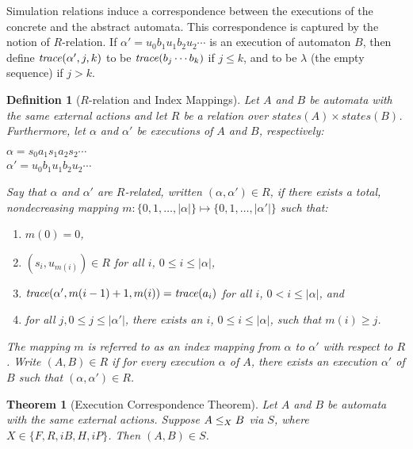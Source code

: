 \documentclass[11pt]{article}
\newcommand{\bn}{\begin{enumerate}}
\newcommand{\en}{\end{enumerate}}
\newcommand{\bt}{\begin{theorem}}
\newcommand{\et}{\end{theorem}}
\newcommand{\bd}{\begin{definition}}
\newcommand{\ed}{\end{definition}}
\newcommand{\intrdef}{\emph}	\newcommand{\intr}{\emph}
\newcommand{\al}{\alpha}
\newcommand{\states}{\mathit{states}}
\newtheorem{theorem}{Theorem}
\newtheorem{definition}{Definition}
\newcommand{\ms}[1]{\relax\ifmmode
                \mathord{\mathcode`\-="702D\it #1\mathcode`\-="2200}\else
{\it #1}\fi
}
\begin{document}
Simulation relations induce a correspondence between the executions of
the concrete and the abstract automata. This correspondence is
captured by the notion of $R$-relation.
If $\alpha' = u_0 b_1 u_1 b_2 u_2 \cdots$ is an execution of automaton
$B$, then define 
$\trace(\al',j,k)$ to be $\mathit{trace}(b_j \cdots b_k)$ if $j \le k$, and
to be $\lambda$ (the empty sequence) if $j > k$.



\bd[$R$-relation and Index Mappings]
Let $A$ and $B$ be automata with the same external actions and let $R$
be a relation over $\states(A) \times \states(B)$. Furthermore, let
$\alpha$ and $\alpha'$ be executions of $A$ and $B$, respectively:
\ms\\
\ind $\alpha  = s_0 a_1 s_1 a_2 s_2 \cdots$ \\
\ind $\alpha' = u_0 b_1 u_1 b_2 u_2 \cdots$ \ms\\
Say that $\alpha$ and $\alpha'$ are \intrdef{$R$-related}, written
$(\alpha, \alpha') \in R$, if there exists a total, nondecreasing mapping
$m: \{0,1,\ldots,|\alpha|\} \mapsto \{0,1,\ldots,|\alpha'|\}$
such that:
\bn
   \item \label{clause:index-mapping:init} $m(0) = 0$,

   \item \label{clause:index-mapping:corr}
         $(s_i, u_{m(i)}) \in R$ for all $i$, $0 \leq i \leq |\alpha|$,

   \item \label{clause:index-mapping:trace}
         $\trace(\al', {m(i-1)+1}, {m(i)}) = \trace(a_i)$ for all 
               $i$, $0 < i \leq |\alpha|$, and



   \item \label{clause:index-mapping:cofinal}
         for all $j, 0 \leq j \leq |\alpha'|$, there exists an $i$, 
             $0 \leq i \leq |\alpha|$, such that $m(i) \geq j$.
\en
The mapping $m$ is referred to as an \intrdef{index mapping} from
$\alpha$ to $\alpha'$ with respect to $R$.
Write $(A,B) \in R$ if for every execution $\alpha$ of $A$, there
exists an execution $\alpha'$ of $B$ such that $(\alpha,\alpha') \in
R$.
\label{def:index-mapping}
\ed






\bt [Execution Correspondence Theorem]
Let $A$ and $B$ be automata with the same external actions.
Suppose $A \leq_X B$ via $S$, where $X \in \{F, R, iB, H, iP\}$.
Then $(A,B) \in S$.
\label{thm:execution-correspondence}
\et
\end{document}

